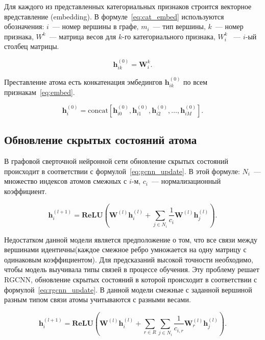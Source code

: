 \documentclass[12pt, twoside]{article}
\begin{document}
 Для каждого из представленных категориальных признаков строится векторное вредставление (embedding). В формуле~\eqref{eq:cat_embed} используются обозначения: $i$~--- номер вершины в графе, $m_i$~--- тип вершины, $k$~--- номер признака, $W^k$~--- матрица весов для $k$-го категориального признака, $W^k_i$ ~--- $i$-ый столбец матрицы.

\begin{equation}
    \mathbf{h}_{ik}^{(0)} = \mathbf{W}^{k}_{i}.
    \label{eq:cat_embed}
\end{equation}

Преставление атома есть конкатенация эмбедингов $\mathbf{h}_{ik}^{(0)}$ по всем признакам~\eqref{eq:embed}.

\begin{equation}
    \mathbf{h}_{i}^{(0)} = \text{concat}[\mathbf{h}_{i0}^{(0)}, \mathbf{h}_{i1}^{(0)}, \mathbf{h}_{i2}^{(0)}, \dots, \mathbf{h}_{iM}^{(0)}].
    \label{eq:embed}
\end{equation}
 
 \subsection{Обновление скрытых состояний атома}
 
 В графовой сверточной нейронной сети обновление скрытых состояний происходит в соответствии с формулой~\eqref{eq:gcnn_update}. В этой формуле:  $N_i$~--- множество индексов атомов смежных с $i$-м, $c_i$~--- нормализационный коэффициент.  

\begin{equation}
    \mathbf{h}^{(l+1)}_i = \mathbf{\text{ReLU}} \left(\mathbf{W}^{(l)}\mathbf{h}^{(l)}_i + \sum \limits_{j \in N_i} \frac{1}{c_i} \mathbf{W}^{(l)}\mathbf{h}^{(l)}_j \right). 
    \label{eq:gcnn_update}
\end{equation}

Недостатком данной модели является предположение о том, что все связи между вершинами идентичны(каждое смежное ребро умножается на одну матрицу с одинаковым коэффициентом). Для предсказаний высокой точности необходимо, чтобы модель выучивала типы связей в процессе обучения. Эту проблему решает RGCNN, обновление скрытых состояний в которой происходит в соответствии с формулой~\eqref{eq:rgcnn_update}. В данной модели смежные с заданной вершиной разным типом связи атомы учитываются с разными весами.  

\begin{equation}
    \mathbf{h}^{(l+1)}_i = \mathbf{\text{ReLU}} \left( \mathbf{W}^{(l)}\mathbf{h}^{(l)}_i + \sum \limits_{r \in R}\sum \limits_{j \in N_i} \frac{1}{c_{i, r}} \mathbf{W}^{(l)}_r \mathbf{h}^{(l)}_j \right). 
    \label{eq:rgcnn_update}
\end{equation}
\end{document}
